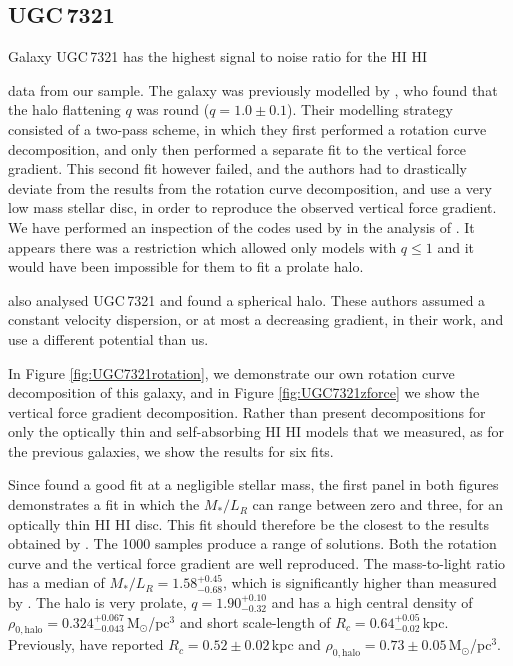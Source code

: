\documentclass[useAMS,usenatbib]{mn2e}
\newcommand{\hi}{%
  \relax
  \ifmmode
    \textrm{\textsc{HI}}
  \else
    \textsc{H{\smaller}I}
  \fi
}
\begin{document}
\subsection{UGC\,7321}
Galaxy UGC\,7321 has the highest signal to noise ratio for the \hi 
data from our sample.
The galaxy was previously modelled by \citet{OBrien2010D}, who found 
that the halo flattening $q$ was round ($q=1.0\pm0.1$).
Their modelling strategy consisted of a two-pass scheme, in which 
they first performed a rotation curve decomposition, and only then 
performed a separate fit to the vertical force gradient.
This second fit however failed, and the authors had to drastically 
deviate from the results from the rotation curve decomposition, and 
use a very low mass stellar disc, in order to reproduce the observed vertical 
force gradient.
We have performed an inspection of the codes used by in the analysis of
\citet{OBrien2010D}. It appears there was a restriction which
allowed only models with $q\leq1$ and
 it would have been impossible for them to fit a prolate halo.

\citet{Banerjee2010A} also analysed {UGC\,7321} and found a spherical halo.
These authors assumed a constant velocity dispersion, or at most a 
decreasing gradient, in their work, and use a different potential than us.

In Figure \ref{fig:UGC7321rotation}, we demonstrate our own rotation 
curve decomposition of this galaxy, and in 
Figure \ref{fig:UGC7321zforce} we show the vertical force gradient 
decomposition.
Rather than present decompositions for only  the optically thin and 
self-absorbing \hi models that we measured, as for the previous 
galaxies, we show the results for six fits.

Since \citet{OBrien2010D} found a good fit at a negligible stellar mass, the 
first panel in both figures demonstrates a fit in which the $M_*/L_{R}$ can 
range between zero and three, for an optically thin \hi disc.
This fit should therefore be the closest to the results obtained by 
\citet{OBrien2010D}.
The 1000 samples produce a range of solutions. 
Both the rotation curve and the vertical force gradient are well reproduced.
The mass-to-light ratio has a median of $M_*/L_{R}= 1.58_{-0.68}^{+0.45}$, 
which is significantly higher than measured by \citet{OBrien2010D}. 
The halo is very prolate, $q =1.90_{-0.32}^{+0.10}$ and has a high central 
density of $\rho_{0,\textrm{halo}} = 0.324_{-0.043}^{+0.067}$\,M$_\odot$/pc$^3$ 
and short scale-length of $R_c = 0.64_{-0.02}^{+0.05}$\,kpc.
Previously, \citet{OBrien2010D} have reported $R_c = 0.52\pm0.02$\,kpc 
and $ \rho_{0,\textrm{halo}} =0.73\pm0.05$\,M$_\odot$/pc$^3$.
\end{document}
